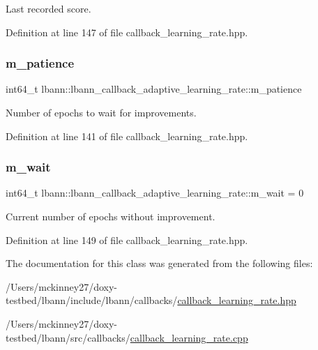 Last recorded score. 

Definition at line 147 of file callback\+\_\+learning\+\_\+rate.\+hpp.

\mbox{\label{classlbann_1_1lbann__callback__adaptive__learning__rate_ac3ac3c4d34d62608c54dfa3a41691217}} 
\subsubsection{\texorpdfstring{m\+\_\+patience}{m\_patience}}
{\footnotesize\ttfamily int64\+\_\+t lbann\+::lbann\+\_\+callback\+\_\+adaptive\+\_\+learning\+\_\+rate\+::m\+\_\+patience\hspace{0.3cm}{\ttfamily [private]}}

Number of epochs to wait for improvements. 

Definition at line 141 of file callback\+\_\+learning\+\_\+rate.\+hpp.

\mbox{\label{classlbann_1_1lbann__callback__adaptive__learning__rate_aecfb70e4a366762305a2dbd8248471de}} 
\subsubsection{\texorpdfstring{m\+\_\+wait}{m\_wait}}
{\footnotesize\ttfamily int64\+\_\+t lbann\+::lbann\+\_\+callback\+\_\+adaptive\+\_\+learning\+\_\+rate\+::m\+\_\+wait = 0\hspace{0.3cm}{\ttfamily [private]}}

Current number of epochs without improvement. 

Definition at line 149 of file callback\+\_\+learning\+\_\+rate.\+hpp.



The documentation for this class was generated from the following files\+:\begin{DoxyCompactItemize}
\item 
/\+Users/mckinney27/doxy-\/testbed/lbann/include/lbann/callbacks/\hyperlink{callback__learning__rate_8hpp}{callback\+\_\+learning\+\_\+rate.\+hpp}\item 
/\+Users/mckinney27/doxy-\/testbed/lbann/src/callbacks/\hyperlink{callback__learning__rate_8cpp}{callback\+\_\+learning\+\_\+rate.\+cpp}\end{DoxyCompactItemize}
